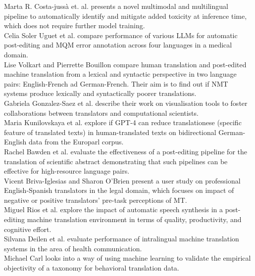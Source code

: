 Marta R. Costa-jussà et. al. presents a novel multimodal and multilingual pipeline to automatically identify and mitigate added toxicity at inference time, which does not require further model training.
\\

Celia Soler Uguet et al. compare performance of various LLMs for automatic post-editing and MQM error annotation across four languages in a medical domain.
\\

Lise Volkart and Pierrette Bouillon compare human translation and post-edited machine translation from a lexical and syntactic perspective in two language pairs: English-French ad German-French. Their aim is to find out if NMT systems produce lexically and syntactically poorer translations.
\\

Gabriela Gonzalez-Saez et al. describe their work  on visualisation tools to foster collaborations between translators and computational scientists. 
\\

Maria Kunilovskaya et al. explore if GPT-4 can reduce translationese (specific feature of translated texts) in human-translated texts on bidirectional German-English data from the Europarl corpus.
\\

Rachel Bawden et al. evaluate the effectiveness of a post-editing pipeline for the translation of scientific abstract demonstrating that such pipelines can be effective for high-resource language pairs.
\\

Vicent Briva-Iglesias and Sharon O'Brien present a user study on professional English-Spanish translators in the legal domain, which focuses on impact of negative or positive translators’ pre-task perceptions of MT.
\\

Miguel Rios et al. explore the impact of automatic speech synthesis in a post-editing machine translation environment in terms of quality, productivity, and cognitive effort.
\\

Silvana Deilen et al. evaluate performance of intralingual machine translation systems in the area of health communication.
\\

Michael Carl looks into a way of using  machine learning to validate the empirical objectivity of a taxonomy for behavioral translation data.
\\


